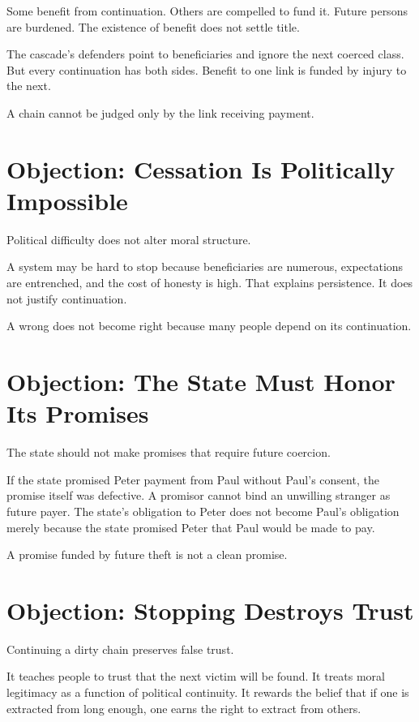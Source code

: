 \documentclass[12pt]{article}
\begin{document}
Some benefit from continuation. Others are compelled to fund it. Future persons are burdened. The existence of benefit does not settle title.

The cascade's defenders point to beneficiaries and ignore the next coerced class. But every continuation has both sides. Benefit to one link is funded by injury to the next.

A chain cannot be judged only by the link receiving payment.

\section{Objection: Cessation Is Politically Impossible}

Political difficulty does not alter moral structure.

A system may be hard to stop because beneficiaries are numerous, expectations are entrenched, and the cost of honesty is high. That explains persistence. It does not justify continuation.

A wrong does not become right because many people depend on its continuation.

\section{Objection: The State Must Honor Its Promises}

The state should not make promises that require future coercion.

If the state promised Peter payment from Paul without Paul's consent, the promise itself was defective. A promisor cannot bind an unwilling stranger as future payer. The state's obligation to Peter does not become Paul's obligation merely because the state promised Peter that Paul would be made to pay.

A promise funded by future theft is not a clean promise.

\section{Objection: Stopping Destroys Trust}

Continuing a dirty chain preserves false trust.

It teaches people to trust that the next victim will be found. It treats moral legitimacy as a function of political continuity. It rewards the belief that if one is extracted from long enough, one earns the right to extract from others.
\end{document}
